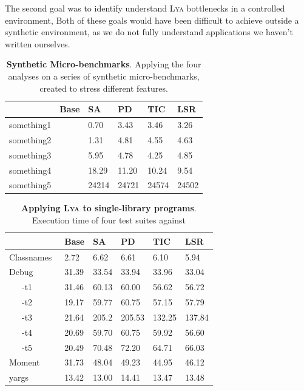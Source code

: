 \documentclass[letterpaper,twocolumn,10pt]{article}
\newcommand{\sys}{{\scshape Lya}\xspace}
\newcommand{\fixme}[1]{{\color{red}#1}}
\begin{document}
The second goal was to identify understand \sys bottlenecks in a controlled environment, 
Both of these goals would have been difficult to achieve outside a synthetic environment, as we do not fully understand applications we haven't written ourselves.

\begin{table}[t]
\center
\footnotesize
\setlength\tabcolsep{3pt}
\caption{
  \footnotesize{
    \textbf{Synthetic Micro-benchmarks}.
		Applying the four analyses on a series of synthetic micro-benchmarks, created to stress different features.
  }
}
\begin{tabular*}{\columnwidth}{l @{\extracolsep{\fill}} ll lll}
\toprule
              &   Base    &  SA     & PD       &   TIC    &   LSR     \\
\midrule
something1    &           &  0.70   &    3.43  &   3.46   &   3.26    \\
something2    &           &  1.31   &    4.81  &   4.55   &   4.63    \\
something3    &           &  5.95   &    4.78  &   4.25   &   4.85    \\
something4    &           &  18.29  &   11.20  &   10.24  &   9.54    \\
something5    &           &  24214  &   24721  &   24574  &   24502   \\
\bottomrule
\end{tabular*}
\label{tab:synthetic}
\vspace{-5mm}
\end{table}

\begin{table}[t]
\center
\footnotesize
\setlength\tabcolsep{3pt}
\caption{
  \footnotesize{
    \textbf{Applying \sys to single-library programs}.
		\fixme{Execution time of four test suites against }
  }
}
\begin{tabular*}{\columnwidth}{l @{\extracolsep{\fill}} ll lll}
\toprule
                    & Base   &  SA   & PD     &   TIC   & LSR     \\
\midrule
Classnames~\cite{}  &  2.72  & 6.62  &  6.61  &  6.10   & 5.94    \\
Debug~\cite{}       & 31.39  & 33.54 &  33.94 &  33.96  & 33.04   \\
~~~-t1              & 31.46  & 60.13 &  60.00 &  56.62  & 56.72   \\
~~~-t2              & 19.17  & 59.77 &  60.75 &  57.15  & 57.79   \\
~~~-t3              & 21.64  & 205.2 &  205.53&  132.25 & 137.84  \\
~~~-t4              & 20.69  & 59.70 &  60.75 &  59.92  & 56.60   \\
~~~-t5              & 20.49  & 70.48 &  72.20 &  64.71  & 66.03   \\
Moment~\cite{}      & 31.73  & 48.04 &  49.23 &  44.95  & 46.12   \\
yargs~\cite{}       & 13.42  & 13.00 &  14.41 &  13.47  & 13.48   \\
\bottomrule
\end{tabular*}
\label{tab:meso}
\vspace{-5mm}
\end{table}
\end{document}
